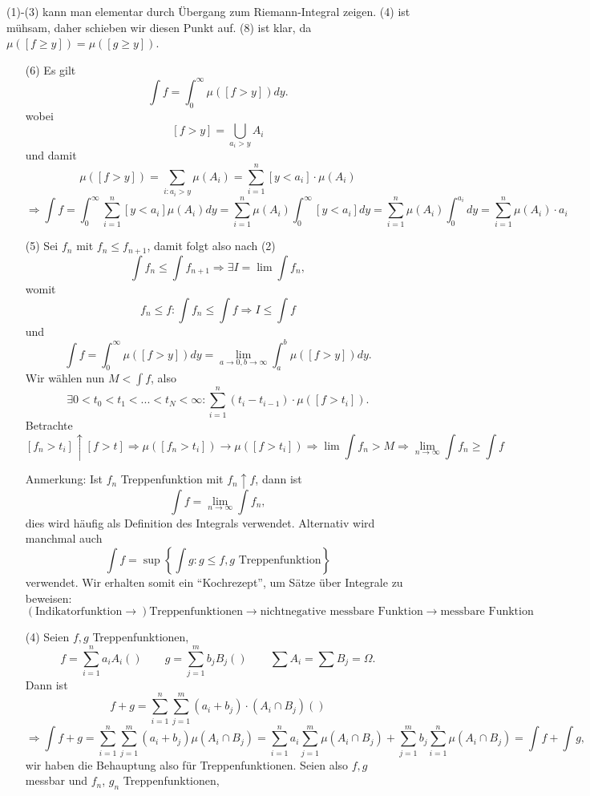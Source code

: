 			\begin{bew}
				(1)-(3) kann man elementar durch Übergang zum Riemann-Integral zeigen. (4) ist mühsam, daher schieben wir diesen Punkt auf. (8) ist klar, da $\mu([f\ge y])=\mu([g\ge y])$.\newline
				\begin{enumerate}[1]
					\item[(6)] Es gilt
					\[ \int f=\int_0^\infty\mu([f>y]) dy. \]
					wobei
					\[ [f>y]=\bigcup_{a_i>y} A_i \]
					und damit
					\[ \mu([f>y])=\sum_{i: a_i>y} \mu(A_i)=\sum_{i=1}^n[y<a_i]\cdot\mu(A_i) \]
					\[ \Rightarrow \int f=\int_0^\infty\sum_{i=1}^{n}[y<a_i]\mu(A_i)dy=\sum_{i=1}^n\mu(A_i)\int_0^\infty [y<a_i]dy=\sum_{i=1}^n\mu(A_i)\int_0^{a_i} dy=\sum_{i=1}^{n}\mu(A_i)\cdot a_i \]
					\arge 
					\item[(5)] Sei $f_n$ mit $f_n\le f_{n+1}$, damit folgt also nach (2)
					\[ \int f_n\le\int f_{n+1}\Rightarrow \exists I=\lim\int f_n, \]
					womit
					\[ f_n\le f: \int f_n\le \int f\Rightarrow I\le \int f \]
					und
					\[ \int f=\int_0^\infty \mu([f>y])dy=\lim\limits_{a\to 0, b\to \infty} \int_a^b\mu([f>y])dy.  \]
					Wir wählen nun $M<\int f$, also
					\[ \exists 0<t_0<t_1<...<t_N<\infty: \sum_{i=1}^{n}(t_i-t_{i-1})\cdot \mu([f>t_i]). \]
					Betrachte
					\[ [f_n>t_i]\uparrow [f>t]\Rightarrow \mu([f_n>t_i])\to \mu([f>t_i])\Rightarrow \lim\int f_n>M\Rightarrow \lim_{n\to\infty} \int f_n\ge\int f \]
					\arge
					\item[Anmerkung: ]Ist $f_n$ Treppenfunktion mit $f_n\uparrow f$, dann ist 
					\[ \int f=\lim_{n\to\infty} \int f_n, \]
					dies wird häufig als Definition des Integrals verwendet. Alternativ wird manchmal auch
					\[ \int f=\sup\left\{\int g: g\le f, g\text{ Treppenfunktion}\right\} \]
					verwendet. Wir erhalten somit ein "`Kochrezept"', um Sätze über Integrale zu beweisen:
					\[ (\text{Indikatorfunktion}\rightarrow) \text{Treppenfunktionen}\rightarrow \text{nichtnegative messbare Funktion}\rightarrow\text{messbare Funktion} \]
					\item[(4)] Seien $f,g$ Treppenfunktionen,
					\[ f=\sum_{i=1}^{n}a_i A_i()\qquad g=\sum_{j=1}^{m}b_j B_j()\qquad \sum A_i=\sum B_j =\Omega. \]
					Dann ist
					\[ f+g=\sum_{i=1}^{n}\sum_{j=1}^{m}(a_i+b_j)\cdot(A_i\cap B_j)() \]
					\[ \Rightarrow \int f+g=\sum_{i=1}^{n}\sum_{j=1}^{m} (a_i+b_j)\mu(A_i\cap B_j)=\sum_{i=1}^{n}a_i\sum_{j=1}^{m} \mu(A_i\cap B_j)+\sum_{j=1}^{m}b_j\sum_{i=1}^{n}\mu(A_i\cap B_j)=\int f+\int g, \]
					wir haben die Behauptung also für Treppenfunktionen. Seien also $f,g$ messbar und $f_n$, $g_n$ Treppenfunktionen,

\end{enumerate}
\end{bew}
